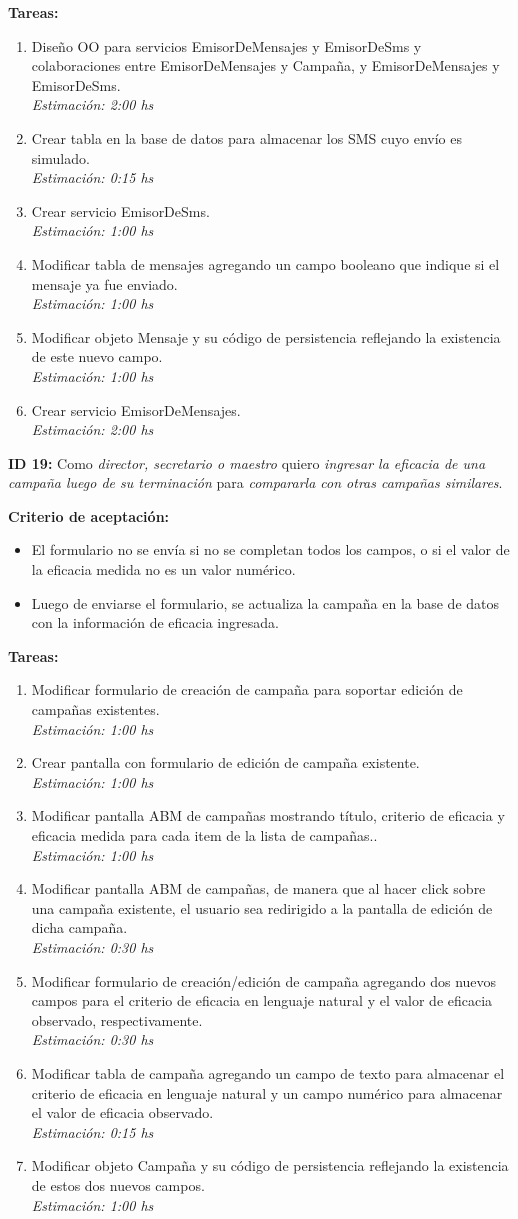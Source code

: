 \documentclass[a4paper, 10pt, twoside]{article}
\newcommand{\sprintstory}[4]{
  \noindent
  \textbf{ID #1:} Como \emph{#2} quiero \emph{#3} para \emph{#4}.
}
\newenvironment{criterios}{
  \textbf{Criterio de aceptación:}
  \begin{itemize}
}{
  \end{itemize}
}
\newcommand{\criterio}[1] {
  \item #1
}
\newenvironment{tasks}{
  \textbf{Tareas:}
  \begin{enumerate}
}{
  \end{enumerate}
}
\newcommand{\task}[2] {
  \item #1.\\
  \emph{Estimación: #2 hs}
}
\begin{document}
\begin{tasks}
  \task{Diseño OO para servicios EmisorDeMensajes y EmisorDeSms y colaboraciones entre EmisorDeMensajes y Campaña, y EmisorDeMensajes y EmisorDeSms}{2:00}
  \task{Crear tabla en la base de datos para almacenar los SMS cuyo envío es simulado}{0:15}
  \task{Crear servicio EmisorDeSms}{1:00}
  \task{Modificar tabla de mensajes agregando un campo booleano que indique si el mensaje ya fue enviado}{1:00}
  \task{Modificar objeto Mensaje y su código de persistencia reflejando la existencia de este nuevo campo}{1:00}
  \task{Crear servicio EmisorDeMensajes}{2:00}
\end{tasks}

\sprintstory{19}
            {director, secretario o maestro}
            {ingresar la eficacia de una campaña luego de su terminación}
            {compararla con otras campañas similares}

\begin{criterios}
  \criterio{El formulario no se envía si no se completan todos los campos, o si el valor de la eficacia medida no es un valor numérico.}
  \criterio{Luego de enviarse el formulario, se actualiza la campaña en la base de datos con la información de eficacia ingresada.}
\end{criterios}

\begin{tasks}
  \task{Modificar formulario de creación de campaña para soportar edición de campañas existentes}{1:00}
  \task{Crear pantalla con formulario de edición de campaña existente}{1:00}
  \task{Modificar pantalla ABM de campañas mostrando título, criterio de eficacia y eficacia medida para cada item de la lista de campañas.}{1:00}
  \task{Modificar pantalla ABM de campañas, de manera que al hacer click sobre una campaña existente, el usuario sea redirigido a la pantalla de edición de dicha campaña}{0:30}
  \task{Modificar formulario de creación/edición de campaña agregando dos nuevos campos para el criterio de eficacia en lenguaje natural y el valor de eficacia observado, respectivamente}{0:30}
  \task{Modificar tabla de campaña agregando un campo de texto para almacenar el criterio de eficacia en lenguaje natural y un campo numérico para almacenar el valor de eficacia observado}{0:15}
  \task{Modificar objeto Campaña y su código de persistencia reflejando la existencia de estos dos nuevos campos}{1:00}
\end{tasks}
\end{document}
